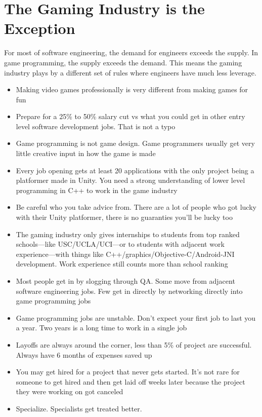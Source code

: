 \documentclass[12pt]{article}
\begin{document}
\section{The Gaming Industry is the Exception}
For most of software engineering, the demand for engineers exceeds the supply.  In game programming, the supply exceeds the demand.  This means the gaming industry plays by a different set of rules where engineers have much less leverage.
\begin{itemize}
\item Making video games professionally is very different from making games for fun
\item Prepare for a 25\% to 50\% salary cut vs what you could get in other entry level software development jobs.  That is not a typo
\item Game programming is not game design.  Game programmers usually get very little creative input in how the game is made
\item Every job opening gets at least 20 applications with the only project being a platformer made in Unity.  You need a strong understanding of lower level programming in C++ to work in the game industry
\item Be careful who you take advice from.  There are a lot of people who got lucky with their Unity platformer, there is no guaranties you'll be lucky too
\item The gaming industry only gives internships to students from top ranked schools---like USC/UCLA/UCI---or to students with adjacent work experience---with things like C++/graphics/Objective-C/Android-JNI development.  Work experience still counts more than school ranking
\item Most people get in by slogging through QA.  Some move from adjacent software engineering jobs.  Few get in directly by networking directly into game programming jobs
\item Game programming jobs are unstable.  Don't expect your first job to last you a year.  Two years is a long time to work in a single job
\item Layoffs are always around the corner, less than 5\% of project are successful.  Always have 6 months of expenses saved up
\item You may get hired for a project that never gets started.  It's not rare for someone to get hired and then get laid off weeks later because the project they were working on got canceled
\item Specialize.  Specialists get treated better.

\end{itemize}
\end{document}
